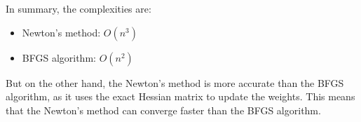 In summary, the complexities are:

\begin{itemize}
    \item Newton's method: \textbf{$O(n^3)$}
    \item BFGS algorithm: \textbf{$O(n^2)$}
\end{itemize}

But on the other hand, the Newton's method is more accurate than the BFGS algorithm, as it uses the
exact Hessian matrix to update the weights. This means that the Newton's method can converge faster
than the BFGS algorithm. 


